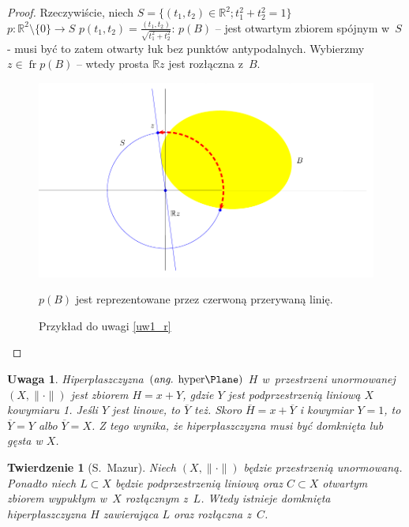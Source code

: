 \documentclass[11pt]{mwrep}
\renewcommand{\[}{\begin{equation}}
\renewcommand{\]}{\end{equation}}
\newcommand{\R}{{\ensuremath{\mathbb R}}}
\newtheorem{twr}[subsection]{Twierdzenie}%
\newtheorem{uwaga}[subsection]{Uwaga}
\begin{document}
\begin{proof}
	Rzeczywiście, niech $S= \{ (t_1, t_2) \in \R^2; t_1^2+t_2^2=1\}$ \\
	$p:\R^2\setminus\{0\} \to S$ $p(t_1,t_2) = \frac{(t_1,t_2)}{\sqrt{t_1^2+t_2^2}}$:
	$p(B)$ -- jest otwartym zbiorem spójnym w~$S$ - musi być to zatem otwarty łuk bez punktów antypodalnych.
Wybierzmy $z \in \operatorname{fr} p(B)$ -- wtedy prosta $\R z$ jest rozłączna z~$B$.\\
\begin{figure}[h]
  \centering
  \includegraphics[scale=.7]{rys1}
  \caption{Przykład do uwagi \ref{uw1_r}}
  \scriptsize{ $p(B)$ jest reprezentowane przez czerwoną przerywaną linię.}
\end{figure}
\end{proof}
\begin{uwaga}
  Hiperpłaszczyzna $\left(\textrm{\textit{ang.} hyper\Plane}\right)$ $H$ w~przestrzeni unormowanej $(X,\|\cdot\|)$ jest zbiorem $H= x+Y$, gdzie $Y$ jest podprzestrzenią liniową $X$ kowymiaru 1.
	Jeśli $Y$ jest linowe, to $\overline{Y}$ też. Skoro $\overline{H}=x+\overline{Y}$ i kowymiar $Y=1$, to $\overline{Y} = Y$ albo $\overline{Y} = X$. Z tego wynika, że hiperpłaszczyzna musi być domknięta lub gęsta w $X$.
\end{uwaga}
\begin{twr}[S.~Mazur]
  \label{maz}
	Niech $(X,\|\cdot\|)$ będzie przestrzenią unormowaną. Ponadto niech $L\subset X$ będzie podprzestrzenią liniową oraz $C\subset X$ otwartym zbiorem wypukłym w~$X$ rozłącznym z~$L$. Wtedy istnieje domknięta hiperpłaszczyzna $H$ zawierająca $L$ oraz rozłączna z~$C$.
\end{twr}
\end{document}
